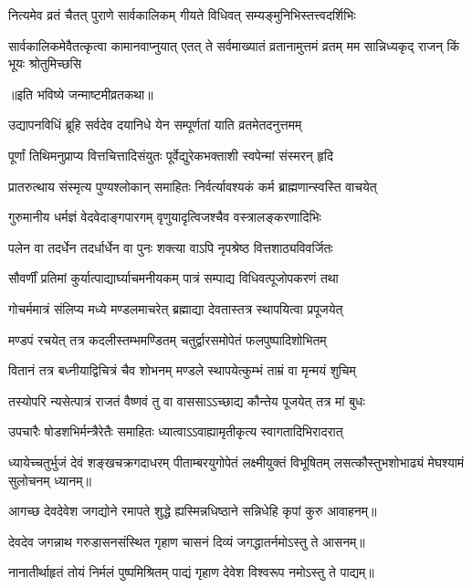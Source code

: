 \twolineshloka
{नित्यमेव व्रतं चैतत् पुराणे सार्वकालिकम्}
{गीयते विधिवत् सम्यङ्मुनिभिस्तत्त्वदर्शिभिः}%

\threelineshloka
{सार्वकालिकमेवैतत्कृत्वा कामानवाप्नुयात्}
{एतत् ते सर्वमाख्यातं व्रतानामुत्तमं व्रतम्}
{मम सान्निध्यकृद् राजन् किं भूयः श्रोतुमिच्छसि}%

\centerline{॥इति भविष्ये जन्माष्टमीव्रतकथा॥}



\twolineshloka
{उद्यापनविधिं ब्रूहि सर्वदेव दयानिधे}
{येन सम्पूर्णतां याति व्रतमेतदनुत्तमम्}

\twolineshloka
{पूर्णां तिथिमनुप्राप्य वित्तचित्तादिसंयुतः}
{पूर्वेद्युरेकभक्ताशी स्वपेन्मां संस्मरन् हृदि}

\twolineshloka
{प्रातरुत्थाय संस्मृत्य पुण्यश्लोकान् समाहितः}
{निर्वर्त्यावश्यकं कर्म ब्राह्मणान्स्वस्ति वाचयेत्}

\twolineshloka
{गुरुमानीय धर्मज्ञं वेदवेदाङ्गपारगम्}
{वृणुयादृत्विजश्चैव वस्त्रालङ्करणादिभिः}

\twolineshloka
{पलेन वा तदर्धेन तदर्धार्धेन वा पुनः}
{शक्त्या वाऽपि नृपश्रेष्ठ वित्तशाठ्यविवर्जितः}

\twolineshloka
{सौवर्णीं प्रतिमां कुर्यात्पाद्यार्घ्याचमनीयकम्}
{पात्रं सम्पाद्य विधिवत्पूजोपकरणं तथा}

\twolineshloka
{गोचर्ममात्रं संलिप्य मध्ये मण्डलमाचरेत्}
{ब्रह्माद्या देवतास्तत्र स्थापयित्वा प्रपूजयेत्}

\twolineshloka
{मण्डपं रचयेत् तत्र कदलीस्तम्भमण्डितम्}
{चतुर्द्वारसमोपेतं फलपुष्पादिशोभितम्}

\twolineshloka
{वितानं तत्र बध्नीयाद्विचित्रं चैव शोभनम्}
{मण्डले स्थापयेत्कुम्भं ताम्रं वा मृन्मयं शुचिम्}

\twolineshloka
{तस्योपरि न्यसेत्पात्रं राजतं वैष्णवं तु वा}
{वाससाऽऽच्छाद्य कौन्तेय पूजयेत् तत्र मां बुधः}

\twolineshloka
{उपचारैः षोडशभिर्मन्त्रैरेतैः समाहितः}
{ध्यात्वाऽऽवाह्यामृतीकृत्य स्वागतादिभिरादरात्}

\threelineshloka
{ध्यायेच्चतुर्भुजं देवं शङ्खचक्रगदाधरम्}
{पीताम्बरयुगोपेतं लक्ष्मीयुक्तं विभूषितम्}
{लसत्कौस्तुभशोभाढ्यं मेघश्यामं सुलोचनम्}
ध्यानम्॥

\twolineshloka
{आगच्छ देवदेवेश जगद्योने रमापते}
{शुद्धे ह्यस्मिन्नधिष्ठाने सन्निधेहि कृपां कुरु}
आवाहनम्॥

\twolineshloka
{देवदेव जगन्नाथ गरुडासनसंस्थित}
{गृहाण चासनं दिव्यं जगद्धातर्नमोऽस्तु ते}
आसनम्॥

\twolineshloka
{नानातीर्थाहृतं तोयं निर्मलं पुष्पमिश्रितम्}
{पाद्यं गृहाण देवेश विश्वरूप नमोऽस्तु ते}
पाद्यम्॥

